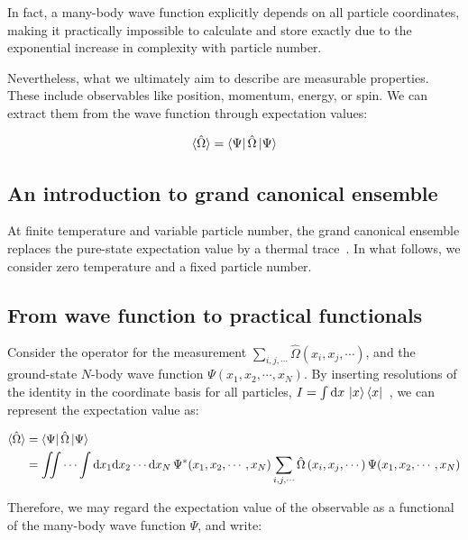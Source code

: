In fact, a many-body wave function explicitly depends on all particle coordinates, making it practically impossible to calculate and store exactly due to the exponential increase in complexity with particle number.

Nevertheless, what we ultimately aim to describe are measurable properties.
These include observables like position, momentum, energy, or spin.
We can extract them from the wave function through expectation values:

\begin{equation}
    \braket{\hat{\Omega}} = \bra{\Psi}\hat{\Omega}\ket{\Psi}
\label{obvious}
\end{equation}

\subsection{An introduction to grand canonical ensemble}

At finite temperature and variable particle number, the grand canonical ensemble replaces the pure-state expectation value by a thermal trace~\cite{gould2026ensemblization,pathria2022statistical}.
In what follows, we consider zero temperature and a fixed particle number.

\subsection{From wave function to practical functionals}

Consider the operator for the measurement $\sum_{i,j,\cdots}\hat\Omega\left(x_i,x_j,\cdots\right)$,
and the ground-state $N$-body wave function $\Psi(x_1,x_2,\cdots,x_N)$.
By inserting resolutions of the identity in the coordinate basis for all particles, $I=\int \mathrm{d}x\,\ket{x}\bra{x}$~\cite{shankar2017quantum},
we can represent the expectation value as:

\begin{equation}
\begin{aligned}
    \braket{\hat\Omega} 
    &= \bra{\Psi}\hat\Omega\ket{\Psi} \\
    &= \iint\cdots\int \mathrm{d}x_1\mathrm{d}x_2\cdots\mathrm{d}x_N\,\Psi^*(x_1,x_2,\cdots,x_N)\sum_{i,j,\cdots}\hat\Omega\left(x_i,x_j,\cdots\right)\Psi(x_1,x_2,\cdots,x_N)
\end{aligned}
\label{observables_N-body}
\end{equation}

Therefore, we may regard the expectation value of the observable as a functional of the many-body wave function $\Psi$, and write:

